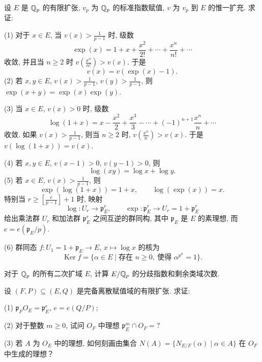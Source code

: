 \begin{Exercises}
\item 设 $E$ 是 $\mathbb{Q}_p$ 的有限扩张, $v_p$ 为 $\mathbb{Q}_p$ 的标准指数赋值, $v$ 为 $v_p$ 到 $E$ 的惟一扩充. 求证:

(1) 对于 $x\in E$, 当 $v(x)>\frac{1}{p-1}$ 时, 级数
\[
  \exp(x)=1+x+\frac{x^2}{2!}+\cdots+\frac{x^n}{n!}+\cdots
\]
收敛, 并且当 $n\geqslant 2$ 时 $v\left(\frac{x^n}{n!}\right)>v(x)$. 于是
\[
  v(x)=v(\exp(x)-1).
\]
(2) 若 $x,y\in E$, $v(x)>\frac{1}{p-1}$, $v(y)>\frac{1}{p-1}$, 则 $\exp(x+y)=\exp(x)\exp(y)$.

(3) 当 $x\in E$, $v(x)>0$ 时, 级数
\[
  \log(1+x)=x-\frac{x^2}{2}+\frac{x^3}{3}-\cdots+(-1)^{n+1}\frac{x^n}{n}+\cdots
\]
收敛. 如果 $v(x)>\frac{1}{p-1}$, 则当 $n\geqslant 2$ 时, $v\left(\frac{x^n}{n}\right)>v(x)$. 于是 $v(\log(1+x))=v(x)$.

(4) 若 $x,y\in E$, $v(x-1)>0$, $v(y-1)>0$, 则
\[
  \log(xy)=\log x+\log y.
\]
(5) 若 $x\in E$, $v(x)>\frac{1}{p-1}$, 则
\[
  \exp(\log(1+x))=1+x,\qquad\log(\exp(x))=x.
\]
特别当 $r\geqslant\left[\frac{e}{p-1}\right]+1$ 时, 映射
\[
  \log\colon U_r\to\mathfrak{p}_E^r,\qquad\exp\colon\mathfrak{p}_E^r\to U_r=1+\mathfrak{p}_E^r
\]
给出乘法群 $U_r$ 和加法群 $\mathfrak{p}_E^r$ 之间互逆的群同构, 其中 $\mathfrak{p}_E$ 是 $E$ 的素理想, 而 $e=e(\mathfrak{p}_E/p)$.

(6) 群同态 $f\colon U_1=1+\mathfrak{p}_E\to E$, $x\mapsto\log x$ 的核为
\[
  \operatorname{Ker}f=\{\alpha\in E\mid\text{存在 } n\geqslant 0,\ \text{使得 } \alpha^{p^n}=1\}.
\]

\item 对于 $\mathbb{Q}_p$ 的所有二次扩域 $E$, 计算 $E/\mathbb{Q}_p$ 的分歧指数和剩余类域次数.

\item 设 $(F,P)\subseteq(E,Q)$ 是完备离散赋值域的有限扩张. 求证:

(1) $\mathfrak{p}_FO_E=\mathfrak{p}_E^e$, $e=e(Q/P)$;

(2) 对于整数 $m\geqslant 0$, 试问 $O_F$ 中理想 $\mathfrak{p}_E^m\cap O_F=?$

(3) 若 $A$ 为 $O_E$ 中的理想, 如何刻画由集合 $N(A)=\{N_{E/F}(\alpha)\mid\alpha\in A\}$ 在 $O_F$ 中生成的理想？
\end{Exercises}
